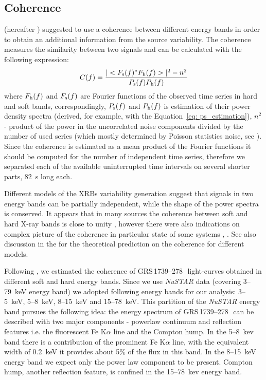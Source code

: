 \documentclass[a4paper,fleqn,usenatbib]{mnras}
\def\grs{{GRS\,1739--278\,}}
\begin{document}
\subsection{Coherence}

\citet{1997ApJ...474L..43V}(hereafter ) suggested to use a coherence between different energy bands in order to obtain an additional information from the source variability. 
The coherence measures the similarity between two signals and can be calculated with the following expression:
\begin{equation}
        C(f) = \frac{|<F_{\rm s}(f)^*F_{\rm h}(f)>|^2 - n^2}{P_{\rm s}(f) P_{\rm h}(f)}
    \label{eq:nowak_coh}
\end{equation}
where $F_{\rm h}(f)$ and $F_{\rm s}(f)$ are Fourier functions of the observed time series in hard and soft bands, correspondingly, $P_{\rm s}(f)$ and $P_{\rm h}(f)$ is estimation of their power density spectra (derived, for example, with the Equation~\ref{eq: ps_estimation}),  
$n^2$ - product of the power in the uncorrelated noise components divided by the number of used series (which mostly determined by Poisson statistics noise, see ). 
Since the coherence is estimated as a mean product of the Fourier functions it should be computed for the number of independent time series, therefore we separated each of the available uninterrupted time intervals on several shorter parts, 82~s long each.  


Different models of the XRBs variability generation suggest that signals in two energy bands can be partially independent, while the shape of the power spectra is conserved.
It appears that in many sources the coherence between soft and hard X-ray bands is close to unity \citep{1999ApJ...517..355N, wijnands99}, however there were also indications  on complex picture of the coherence in particular state of some systems \citep[dip in the coherence at 0.03~Hz frequency, observed in GRS1915+105, ][]{2003ApJ...584L..23J}, \citep[decreasing of the coherence between particular energy bandse in GX 339--4, ][]{1997ApJ...474L..43V}.
See also discussion in the  for the theoretical prediction on the coherence for different models.

Following , we estimated the coherence of \grs\ light-curves obtained in different soft and hard energy bands. 
Since we use {\it NuSTAR} data (covering 3--79~keV energy band) we adopted following energy bands for our analysis: 3--5~keV, 5--8~keV, 8--15~keV and 15--78~keV.
This partition of the {\it NuSTAR} energy band pursues the following idea: the energy spectrum of \grs\ can be described with two major components - powerlaw continuum and reflection features i.e. the fluorescent Fe K$\alpha$ line and the Compton hump.
In the 5--8~kev band there is a contribution of the prominent Fe K$\alpha$ line, with the equivalent width of 0.2~keV it provides about 5\% of the flux in this band.
In the 8--15~keV energy band we expect only the power law component to be present.
Compton hump, another reflection feature, is confined in the 15--78~kev energy band. 
\end{document}
